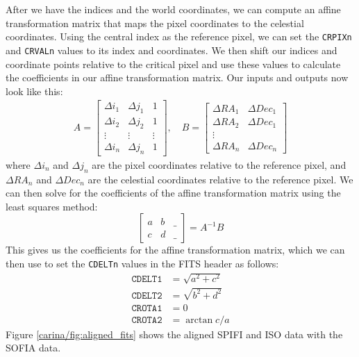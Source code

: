 After we have the indices and the world coordinates, we can compute an affine transformation matrix that maps the pixel coordinates to the celestial coordinates.
Using the central index as the reference pixel, we can set the \texttt{CRPIXn} and \texttt{CRVALn} values to its index and coordinates.
We then shift our indices and coordinate points relative to the critical pixel and use these values to calculate the coefficients in our affine transformation matrix.
Our inputs and outputs now look like this:
\begin{align}
    A = \begin{bmatrix}
        \Delta i_1 & \Delta j_1 & 1 \\
        \Delta i_2 & \Delta j_2 & 1 \\
        \vdots & \vdots & \vdots \\
        \Delta i_n & \Delta j_n & 1
    \end{bmatrix}, \quad
    B = \begin{bmatrix}
        \Delta RA_1 & \Delta Dec_1\\
        \Delta RA_2 & \Delta Dec_1\\
        \vdots \\
        \Delta RA_n & \Delta Dec_n
    \end{bmatrix}
\end{align}
where $\Delta i_n$ and $\Delta j_n$ are the pixel coordinates relative to the reference pixel, and $\Delta RA_n$ and $\Delta Dec_n$ are the celestial coordinates relative to the reference pixel.
We can then solve for the coefficients of the affine transformation matrix using the least squares method:
\begin{equation}
    \begin{bmatrix}
        a & b & \_ \\
        c & d & \_
    \end{bmatrix} = A^{-1}B
\end{equation}
This gives us the coefficients for the affine transformation matrix, which we can then use to set the \texttt{CDELTn} values in the FITS header as follows:
\begin{align}
    \texttt{CDELT1} &= \sqrt{a^2 + c^2} \\
    \texttt{CDELT2} &= \sqrt{b^2 + d^2} \\
    \texttt{CROTA1} &= 0 \\
    \texttt{CROTA2} &= \arctan{c/a}
\end{align}
Figure \ref{carina/fig:aligned_fits} shows the aligned SPIFI and ISO data with the SOFIA data.


